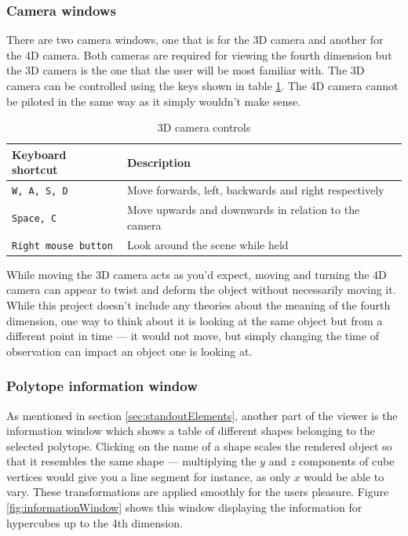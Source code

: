 \documentclass[11pt, a4paper]{article}
\begin{document}
\subsubsection{Camera windows}

There are two camera windows, one that is for the 3D camera and another for the 4D camera. Both cameras are required for viewing the fourth dimension but the 3D camera is the one that the user will be most familiar with. The 3D camera can be controlled using the keys shown in table \ref{table:cameraControls}. The 4D camera cannot be piloted in the same way as it simply wouldn't make sense.

\begin{table}[!h]
  \centering
  \begin{tabular}{ | l | p{9.5cm} |}
    \hline
    \textbf{Keyboard shortcut} & \textbf{Description} \\ \hline
    \texttt{W, A, S, D} & Move forwards, left, backwards and right respectively \\ \hline
    \texttt{Space, C} & Move upwards and downwards in relation to the camera \\ \hline
    \texttt{Right mouse button} & Look around the scene while held \\ \hline
  \end{tabular}
  \caption{3D camera controls}
  \label{table:cameraControls}
\end{table}

While moving the 3D camera acts as you'd expect, moving and turning the 4D camera can appear to twist and deform the object without necessarily moving it. While this project doesn't include any theories about the meaning of the fourth dimension, one way to think about it is looking at the same object but from a different point in time --- it would not move, but simply changing the time of observation can impact an object one is looking at.

\subsubsection{Polytope information window}

As mentioned in section \ref{sec:standoutElements}, another part of the viewer is the information window which shows a table of different shapes belonging to the selected polytope. Clicking on the name of a shape scales the rendered object so that it resembles the same shape --- multiplying the $y$ and $z$ components of cube vertices would give you a line segment for instance, as only $x$ would be able to vary. These transformations are applied smoothly for the users pleasure. Figure \ref{fig:informationWindow} shows this window displaying the information for hypercubes up to the 4th dimension.
\end{document}

